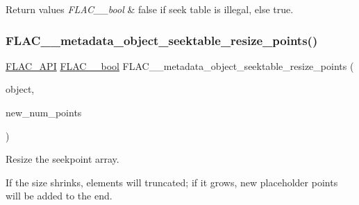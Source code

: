 \begin{DoxyRetVals}{Return values}
{\em F\+L\+A\+C\+\_\+\+\_\+bool} & {\ttfamily false} if seek table is illegal, else {\ttfamily true}. \\
\hline
\end{DoxyRetVals}
\mbox{\label{group__flac__metadata__object_ga836f94fa622ece4f50dadf27c7ec107a}} 
\subsubsection{\texorpdfstring{F\+L\+A\+C\+\_\+\+\_\+metadata\+\_\+object\+\_\+seektable\+\_\+resize\+\_\+points()}{FLAC\_\_metadata\_object\_seektable\_resize\_points()}}
{\footnotesize\ttfamily \hyperlink{group__flac__export_ga56ca07df8a23310707732b1c0007d6f5}{F\+L\+A\+C\+\_\+\+A\+PI} \hyperlink{ordinals_8h_a95103469f1cbd78b8cf250194985b34e}{F\+L\+A\+C\+\_\+\+\_\+bool} F\+L\+A\+C\+\_\+\+\_\+metadata\+\_\+object\+\_\+seektable\+\_\+resize\+\_\+points (\begin{DoxyParamCaption}\item[{\hyperlink{struct_f_l_a_c_____stream_metadata}{F\+L\+A\+C\+\_\+\+\_\+\+Stream\+Metadata} $\ast$}]{object,  }\item[{unsigned}]{new\+\_\+num\+\_\+points }\end{DoxyParamCaption})}

Resize the seekpoint array.

If the size shrinks, elements will truncated; if it grows, new placeholder points will be added to the end.


